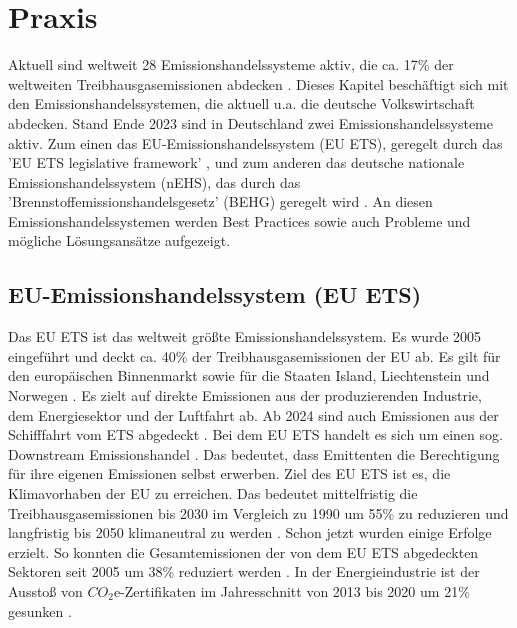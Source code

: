 \chapter{Praxis}

Aktuell sind weltweit 28 Emissionshandelssysteme aktiv, die ca. 17\% der weltweiten Treibhausgasemissionen abdecken \cite[S. 7]{icap.2023}.
Dieses Kapitel beschäftigt sich mit den Emissionshandelssystemen, die aktuell u.a. die deutsche Volkswirtschaft abdecken.
Stand Ende 2023 sind in Deutschland zwei Emissionshandelssysteme aktiv.
Zum einen das EU-Emissionshandelssystem (EU ETS), geregelt durch das 'EU ETS legislative framework' \cite{eu.2023}, und zum anderen das deutsche nationale Emissionshandelssystem (nEHS), das durch das 'Brennstoffemissionshandelsgesetz' (BEHG) geregelt wird \cite{dehst.2023}.
An diesen Emissionshandelssystemen werden Best Practices sowie auch Probleme und mögliche Lösungsansätze aufgezeigt.

\section{EU-Emissionshandelssystem (EU ETS)}

Das EU ETS ist das weltweit größte Emissionshandelssystem. Es wurde 2005 eingeführt und deckt ca. 40\% der Treibhausgasemissionen der EU ab. Es gilt für den europäischen Binnenmarkt sowie für die Staaten Island, Liechtenstein und Norwegen \cite[S. 186]{hubert.2020}.
Es zielt auf direkte Emissionen aus der produzierenden Industrie, dem Energiesektor und der Luftfahrt ab. Ab 2024 sind auch Emissionen aus der Schifffahrt vom ETS abgedeckt \cite{eu.2023}.
Bei dem EU ETS handelt es sich um einen sog. Downstream Emissionshandel \cite{dehst.2023}. 
Das bedeutet, dass Emittenten die Berechtigung für ihre eigenen Emissionen selbst erwerben. Ziel des EU ETS ist es, die Klimavorhaben der EU zu erreichen.
Das bedeutet mittelfristig die Treibhausgasemissionen bis 2030 im Vergleich zu 1990 um 55\% zu reduzieren und langfristig bis 2050 klimaneutral zu werden \cite{eu.2023}. Schon jetzt wurden einige Erfolge erzielt. 
So konnten die Gesamtemissionen der von dem EU ETS abgedeckten Sektoren seit 2005 um 38\% reduziert werden \cite{dehst3.2023}.
In der Energieindustrie ist der Ausstoß von $CO_2$e-Zertifikaten im Jahresschnitt von 2013 bis 2020 um 21\% gesunken \cite{ub3.2023}.

